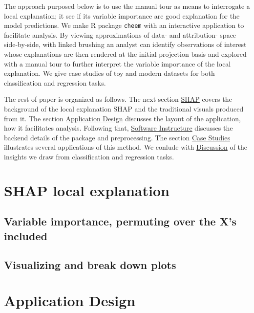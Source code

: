 \documentclass[
]{article}
\begin{document}
The approach purposed below is to use the manual tour as means to interrogate a local explanation; it see if its variable importance are good explanation for the model predictions. We make R package \texttt{cheem} with an interactive application to facilitate analysis. By viewing approximations of data- and attribution- space side-by-side, with linked brushing an analyst can identify observations of interest whose explanations are then rendered at the initial projection basis and explored with a manual tour to further interpret the variable importance of the local explanation. We give case studies of toy and modern datasets for both classification and regression tasks.

The rest of paper is organized as follows. The next section \protect\hyperlink{sec:SHAP}{SHAP} covers the background of the local explanation SHAP and the traditional visuals produced from it. The section \protect\hyperlink{sec:applicationdesign}{Application Design} discusses the layout of the application, how it facilitates analysis. Following that, \protect\hyperlink{sec:softwareinfrastructure}{Software Instructure} discusses the backend details of the package and preprocessing. The section \protect\hyperlink{sec:casestudies}{Case Studies} illustrates several applications of this method. We conlude with \protect\hyperlink{sec:discussion}{Discussion} of the insights we draw from classification and regression tasks.

\hypertarget{sec:SHAP}{%
\section{SHAP local explanation}\label{sec:SHAP}}

\hypertarget{variable-importance-permuting-over-the-xs-included}{%
\subsection{Variable importance, permuting over the X's included}\label{variable-importance-permuting-over-the-xs-included}}

\hypertarget{visualizing-and-break-down-plots}{%
\subsection{Visualizing and break down plots}\label{visualizing-and-break-down-plots}}

\hypertarget{sec:applicationdesign}{%
\section{Application Design}\label{sec:applicationdesign}}
\end{document}
